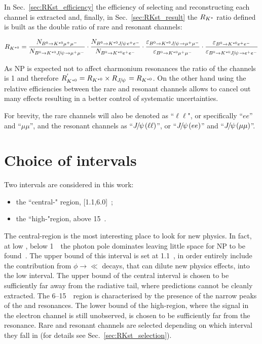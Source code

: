 In Sec.~\ref{sec:RKst_efficiency} the efficiency of selecting and reconstructing each channel is extracted
and, finally, in Sec.~\ref{sec:RKst_result} the $R_{{{K}^*}}$ ratio defined is built as the double ratio
of rare and resonant channels:

\begin{equation}
\label{eq:RKst}
R_{\Kstarz} = 
\frac{N_{\Bz\to\Kstarz \mumu}}{N_{\Bz\to\Kstarz\jpsi\to \mumu}} 
\cdot \frac{N_{\Bz\to\Kstarz \jpsi \ee}}{N_{\Bz\to\Kstarz\ee}}
\cdot \frac{\varepsilon_{\Bz\to\Kstarz \jpsi \to \mumu}}{\varepsilon_{\Bz\to\Kstarz \mumu}} 
\cdot \frac{\varepsilon_{\Bz\to\Kstarz \ee}}{\varepsilon_{\Bz\to\Kstarz\jpsi\to \ee}}
\end{equation}

As NP is expected not to affect charmonium resonances the ratio of the \jpsi channels
is 1 and therefore $R_{\Kstarz}^{'} = R_{\Kstarz} \times R_{\jpsi} = R_{\Kstarz}$.
On the other hand using the relative efficiencies between the rare and resonant channels
allows to cancel out many effects resulting in a better control of systematic uncertainties.  

For brevity, the rare channels will also be denoted as ``$\ell\ell$", or
specifically ``$ee$'' and ``$\mu\mu$'', and the resonant channels as ``$\jpsi(\ell\ell)$'',
or ``$\jpsi(ee)$'' and ``$\jpsi(\mu\mu)$''.

\section{Choice of \qsq intervals}
\label{sec:RKst_q2_choice}

Two \qsq intervals are considered in this work: 
\begin{itemize}
\item the ``central-\qsq" region, [1.1,6.0]~\gevgevcccc;
\item the ``high-\qsq "region, above 15~\gevgevcccc.
\end{itemize}
%
The central-\qsq region is the most interesting place to look for new physics. In fact, at low \qsq, below 
1~\gevgevcccc~the photon pole dominates leaving little space for NP to be found~\cite{TomRDreview}.
The upper bound of this interval is set at 1.1~\gevgevcccc, in order entirely include the contribution
from $\phi\to\ll$ decays, that can dilute new physics effects, into the low \qsq interval.
The upper bound of the central interval is chosen to be sufficiently far away from the \jpsi radiative
tail, where predictions cannot be cleanly extracted. The 6--15~\gevgevcccc~region is characterised by the presence
of the narrow peaks of the \jpsi and \psitwos resonances. The lower bound of the high-\qsq region, where
the signal in the electron channel is still unobserved, is chosen to be sufficiently far from the \psitwos resonance.
Rare and resonant channels are selected depending on which \qsq interval they fall in (for details see Sec.~\ref{sec:RKst_selection}).


